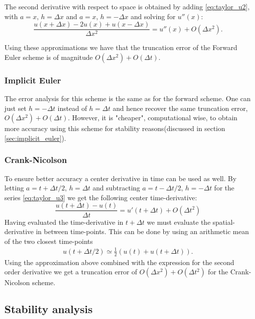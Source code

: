 \documentclass[11pt,a4paper,final]{article}
\numberwithin{equation}{section}
\begin{document}
The second derivative with respect to space is obtained by adding 
\eqref{eq:taylor_u2}, with $a=x$,  $h=\Delta x$ and 
$a=x$,  $h= -\Delta x$ and solving for $u''(x)$:
\begin{equation}
\frac{u(x+\Delta x)-2u(x)+u(x-\Delta x)}{\Delta x^2} = u''(x)+O(\Delta x^2).
\end{equation}  

Using these approximations we have that the truncation error of the Forward Euler scheme is of magnitude $O(\Delta x^2)+O(\Delta t)$.  

\subsubsection{Implicit Euler}
The error analysis for this scheme is the same as for the forward scheme. One can just set $h=- \Delta t$
instead of $h=\Delta t$ and hence recover the same truncation error, $O(\Delta x^2)+O(\Delta t)$. 
However, it is "cheaper", computational wise, to obtain more accuracy using this scheme for stability reasons(discussed in section \ref{sec:implicit_euler}). 

\subsubsection{Crank-Nicolson}
To ensure better accuracy a center derivative in time can be used as well. By letting $a=t+\Delta t/2$, $h=\Delta t$ and subtracting $a=t-\Delta t/2$, $h=-\Delta t$ for the series \eqref{eq:taylor_u3} we get the following center time-derivative:
\begin{equation}
\frac{u(t + \Delta t)-u(t)}{\Delta t} = u'(t+\Delta t) + O(\Delta t^2)
\end{equation}
Having evaluated the time-derivative in $t+\Delta t$ we must evaluate the spatial-derivative in between time-points. This can be done by using an arithmetic mean of the two closest time-points
\begin{align*}
u(t+\Delta t/2) \simeq \frac{1}{2}(u(t)+u(t+\Delta t)).
\end{align*}
Using the approximation above combined with the expression for the second order derivative we get a truncation error of $O(\Delta x^2)+O(\Delta t^2)$ for the Crank-Nicolson scheme.

\subsection{Stability analysis}
\end{document}
